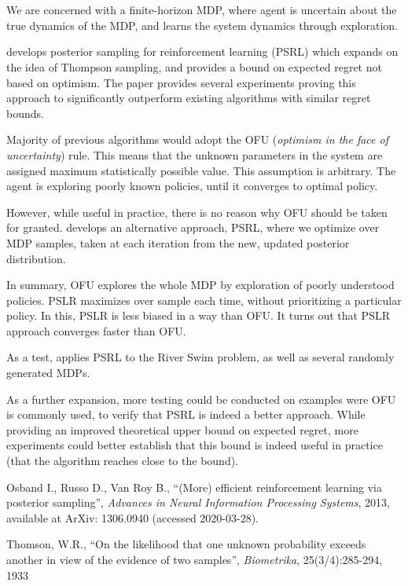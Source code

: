 \section{}\label{question5}

We are concerned with a finite-horizon MDP, where agent is uncertain about the true dynamics of the MDP, and learns the system dynamics through exploration.

\cite{osband} develops posterior sampling for reinforcement learning (PSRL) which expands on the idea of Thompson sampling\cite{thompson}, and provides a bound on expected regret not based on optimism. The paper provides several experiments proving this approach to significantly outperform existing algorithms with similar regret bounds.

Majority of previous algorithms would adopt the OFU (\textit{optimism in the face of uncertainty}) rule. This means that the unknown parameters in the system are assigned maximum statistically possible value. This assumption is arbitrary. The agent is exploring poorly known policies, until it converges to optimal policy.

However, while useful in practice, there is no reason why OFU should be taken for granted. \cite{osband} develops an alternative approach, PSRL, where we optimize over MDP samples, taken at each iteration from the new, updated posterior distribution.

In summary, OFU explores the whole MDP by exploration of poorly understood policies. PSLR maximizes over sample each time, without prioritizing a particular policy. In this, PSLR is less biased in a way than OFU. It turns out that PSLR approach converges faster than OFU.

As a test, \cite{osband} applies PSRL to the River Swim problem, as well as several randomly generated MDPs.

As a further expansion, more testing could be conducted on examples were OFU is commonly used, to verify that PSRL is indeed a better approach. While providing an improved theoretical upper bound on expected regret, more experiments could better establish that this bound is indeed useful in practice (that the algorithm reaches close to the bound).

\begingroup
\let\clearpage\relax

\begin{thebibliography}{2}

Osband I., Russo D., Van Roy B., 
``(More) efficient reinforcement learning via posterior sampling'', \textit{Advances in Neural Information Processing Systems}, 2013, available at ArXiv: 1306.0940 (accessed 2020-03-28).

Thomson, W.R.,
``On the likelihood that one unknown probability exceeds another in view of the evidence of two samples'', \textit{Biometrika}, 25(3/4):285-294, 1933
\end{thebibliography}
\endgroup